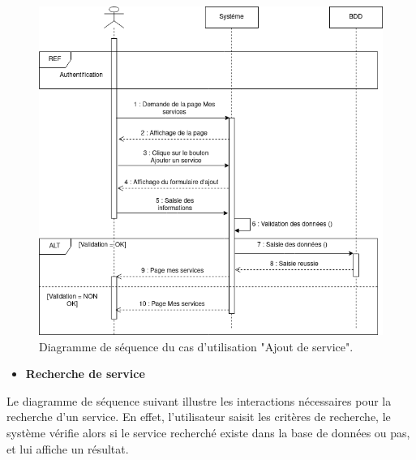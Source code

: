 \documentclass[french]{report}
\begin{document}
    \begin{figure}[H]
            \centering
            \includegraphics[width=1\textwidth]{images/Seq Diag Ajout Services.drawio.png}
            \caption{Diagramme de séquence du cas d'utilisation "Ajout de service".}
            \label{fig:my_label}
    \end{figure}
        
\newpage
\begin{itemize}
\item \textbf{Recherche de service}
\end{itemize}
    Le diagramme de séquence suivant illustre les interactions nécessaires pour 
    la recherche d'un service. En effet, l'utilisateur saisit les critères de recherche,
    le système vérifie alors si le service recherché existe dans la base de données ou pas, et lui affiche un résultat.
        
\end{document}
